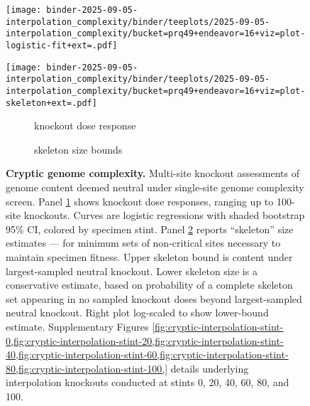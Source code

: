 \begin{figure}

\begin{minipage}{\linewidth}
\centering
\begin{minipage}{0.4\linewidth}
\texttt{[image: binder-2025-09-05-interpolation\_complexity/binder/teeplots/2025-09-05-interpolation\_complexity/bucket=prq49+endeavor=16+viz=plot-logistic-fit+ext=.pdf]}
\end{minipage}%
\begin{minipage}{0.6\linewidth}
\texttt{[image: binder-2025-09-05-interpolation\_complexity/binder/teeplots/2025-09-05-interpolation\_complexity/bucket=prq49+endeavor=16+viz=plot-skeleton+ext=.pdf]}
\end{minipage}
\end{minipage}

\vspace{-1ex}\textsc{}

\begin{minipage}{\linewidth}
\centering
\begin{subfigure}[t]{0.4\linewidth}
\caption{\footnotesize knockout dose response}
\label{fig:cryptic:logistic}
\end{subfigure}%
\begin{subfigure}[t]{0.6\linewidth}
\caption{\footnotesize skeleton size bounds}
\label{fig:cryptic:skeleton}
\end{subfigure}
\end{minipage}

\caption{
\textbf{Cryptic genome complexity.}
Multi-site knockout assessments of genome content deemed neutral under single-site genome complexity screen.
Panel \ref{fig:cryptic:logistic} shows knockout dose responses, ranging up to 100-site knockouts.
Curves are logistic regressions with shaded bootstrap 95\% CI, colored by specimen stint.
Panel \ref{fig:cryptic:skeleton} reports ``skeleton'' size estimates --- for minimum sets of non-critical sites necessary to maintain specimen fitness.
Upper skeleton bound is content under largest-sampled neutral knockout.
Lower skeleton size is a conservative estimate, based on probability of a complete skeleton set appearing in no sampled knockout doses beyond largest-sampled neutral knockout.
Right plot log-scaled to show lower-bound estimate.
Supplementary Figures \cref{fig:cryptic-interpolation-stint-0,fig:cryptic-interpolation-stint-20,fig:cryptic-interpolation-stint-40,fig:cryptic-interpolation-stint-60,fig:cryptic-interpolation-stint-80,fig:cryptic-interpolation-stint-100,} details underlying interpolation knockouts conducted at stints 0, 20, 40, 60, 80, and 100.
}
\label{fig:cryptic}

\end{figure}
